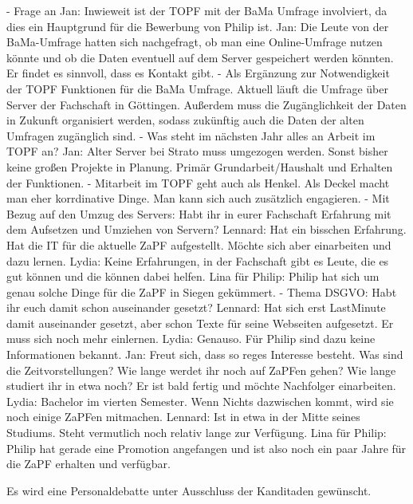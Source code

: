     \begin{outline}
      - Frage an Jan: Inwieweit ist der TOPF mit der BaMa Umfrage involviert, da dies ein Hauptgrund für die Bewerbung von Philip ist.
        \2 Jan: Die Leute von der BaMa-Umfrage hatten sich nachgefragt, ob man eine Online-Umfrage nutzen könnte und ob die Daten eventuell auf dem Server gespeichert werden könnten. Er findet es sinnvoll, dass es Kontakt gibt.
        - Als Ergänzung zur Notwendigkeit der TOPF Funktionen für die BaMa Umfrage. Aktuell läuft die Umfrage über Server der Fachschaft in Göttingen. Außerdem muss die Zugänglichkeit der Daten in Zukunft organisiert werden, sodass zukünftig auch die Daten der alten Umfragen zugänglich sind.
      - Was steht im nächsten Jahr alles an Arbeit im TOPF an?
        \2 Jan: Alter Server bei Strato muss umgezogen werden. Sonst bisher keine großen Projekte in Planung. Primär Grundarbeit/Haushalt und Erhalten der Funktionen.
        - Mitarbeit im TOPF geht auch als Henkel. Als Deckel macht man eher korrdinative Dinge. Man kann sich auch zusätzlich engagieren.
      - Mit Bezug auf den Umzug des Servers: Habt ihr in eurer Fachschaft Erfahrung mit dem Aufsetzen und Umziehen von Servern?
        \2 Lennard: Hat ein bisschen Erfahrung. Hat die IT für die aktuelle ZaPF aufgestellt. Möchte sich aber einarbeiten und dazu lernen.
        \2 Lydia: Keine Erfahrungen, in der Fachschaft gibt es Leute, die es gut können und die können dabei helfen.
        \2 Lina für Philip: Philip hat sich um genau solche Dinge für die ZaPF in Siegen gekümmert.
      - Thema DSGVO: Habt ihr euch damit schon auseinander gesetzt?
        \2 Lennard: Hat sich erst LastMinute damit auseinander gesetzt, aber schon Texte für seine Webseiten aufgesetzt. Er muss sich noch mehr einlernen.
        \2 Lydia: Genauso.
        \2 Für Philip sind dazu keine Informationen bekannt.
      \1 Jan: Freut sich, dass so reges Interesse besteht. Was sind die Zeitvorstellungen? Wie lange werdet ihr noch auf ZaPFen gehen? Wie lange studiert ihr in etwa noch? Er ist bald fertig und möchte Nachfolger einarbeiten.
        \2 Lydia: Bachelor im vierten Semester. Wenn Nichts dazwischen kommt, wird sie noch einige ZaPFen mitmachen.
        \2 Lennard: Ist in etwa in der Mitte seines Studiums. Steht vermutlich noch relativ lange zur Verfügung.
        \2 Lina für Philip: Philip hat gerade eine Promotion angefangen und ist also noch ein paar Jahre für die ZaPF erhalten und verfügbar.
    \end{outline}
    Es wird eine Personaldebatte unter Ausschluss der Kanditaden gewünscht.

